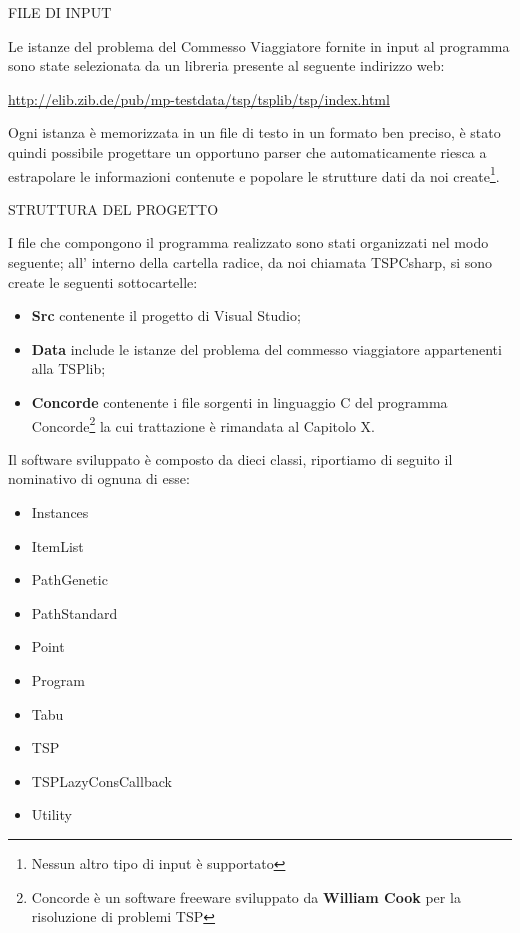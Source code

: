 \documentclass[11pt]{article}
\begin{document}
\vspace{2\baselineskip}
FILE DI INPUT
\vspace{2\baselineskip}


Le istanze del problema del Commesso Viaggiatore fornite in input al programma sono state selezionata da un libreria presente al seguente indirizzo web: 

\begin{center}
\href{http://elib.zib.de/pub/mp-testdata/tsp/tsplib/tsp/index.html}{http://elib.zib.de/pub/mp-testdata/tsp/tsplib/tsp/index.html}
\end{center}

Ogni istanza è memorizzata in un file di testo in un formato ben preciso, è stato quindi possibile progettare un opportuno parser che automaticamente riesca a estrapolare le informazioni contenute e popolare le strutture dati da noi create\footnote{Nessun altro tipo di input è supportato}. 

\vspace{2\baselineskip}



\vspace{2\baselineskip}
STRUTTURA DEL PROGETTO
\vspace{2\baselineskip}


I file che compongono il programma realizzato sono stati organizzati nel modo seguente; all' interno della cartella radice, da noi chiamata TSPCsharp, si sono create le seguenti sottocartelle:

\begin{itemize}
\item \textbf{Src} contenente il progetto di Visual Studio;
\item \textbf{Data} include le istanze del problema del commesso viaggiatore appartenenti alla TSPlib;
\item \textbf{Concorde} contenente i file sorgenti in linguaggio C del programma Concorde\footnote{Concorde è un software freeware sviluppato da \textbf{William Cook} per la risoluzione di problemi TSP} la cui trattazione è rimandata al Capitolo X.
\end{itemize}

Il software sviluppato è composto da dieci classi, riportiamo di seguito il nominativo di ognuna di esse:

\begin{itemize}
\item Instances
\item ItemList
\item PathGenetic
\item PathStandard
\item Point
\item Program
\item Tabu
\item TSP
\item TSPLazyConsCallback
\item Utility
\end{itemize}
\end{document}
